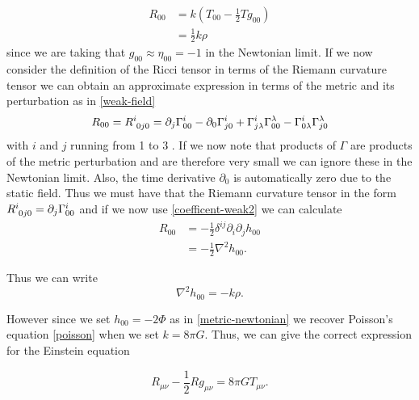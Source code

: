 \begin{equation} \label{einstein-equation-newtonian}
	\begin{aligned}
		R_{00} &= k \left( T_{00} - \frac{1}{2} T g_{00}\right) \\
		&= \frac{1}{2} k \rho
	\end{aligned}
\end{equation}
since we are taking that \(g_{00} \approx \eta_{00} = -1\) in the Newtonian limit. If we now consider the definition of the Ricci tensor in terms of the Riemann curvature tensor we can obtain an approximate expression in terms of the metric and its perturbation as in \eqref{weak-field}
\begin{equation} \label{riemann-weak}
	 R_{00} = R\indices{^i_0_j_0} = \partial_{j} \Gamma^{i}_{00} - \partial_{0} \Gamma^{i}_{j0} + \Gamma^{i}_{j\lambda} \Gamma^{\lambda}_{00} - \Gamma^{i}_{0\lambda} \Gamma^{\lambda}_{j0}
\end{equation}
with \(i\) and \(j\) running from 1 to 3 \cite{carroll}. If we now note that products of \(\Gamma\) are products of the metric perturbation and are therefore very small we can ignore these in the Newtonian limit. Also, the time derivative \(\partial_{0}\) is automatically zero due to the static field. Thus we must have that the Riemann curvature tensor in the form \(R\indices{^i_0_j_0} = \partial_{j} \Gamma^{i}_{00}\) and if we now use \eqref{coefficent-weak2} we can calculate 
\begin{equation} \label{soclose}
	\begin{aligned}
		R_{00} &= - \frac{1}{2} \delta^{ij} \partial_i \partial_j h_{00} \\
		&= - \frac{1}{2} \nabla^2 h_{00} .
	\end{aligned}
\end{equation}

Thus we can write
\begin{equation} \label{icantasteit}
	\nabla^2 h_{00} = - k \rho .
\end{equation}

However since we set \(h_{00} = -2\Phi\) as in \eqref{metric-newtonian} we recover Poisson's equation \eqref{poisson} when we set \(k = 8 \pi G\). Thus, we can give the correct expression for the Einstein equation

\begin{equation} \label{einstein-right}
	R_{\mu \nu} - \frac{1}{2} R g_{\mu \nu} = 8 \pi G T_{\mu \nu} .
\end{equation}

